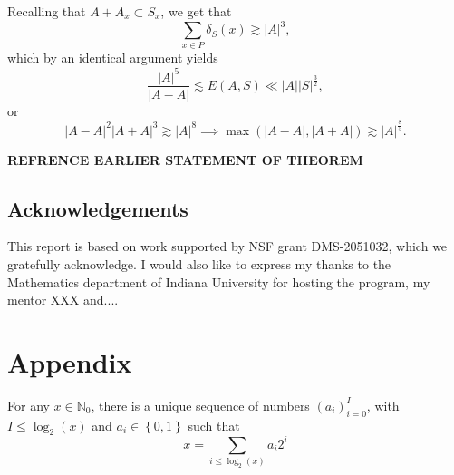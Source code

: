 \documentclass[12pt,reqno]{amsart}
\begin{document}
Recalling that \(A + A_{x} \subset S_{x} \), we get that
\[
    \sum _{x \in P} \delta_{S} (x) \gtrsim \left\lvert A \right\rvert ^{3} 
,\]
which by an identical argument yields
\[
    \frac{\left\lvert A \right\rvert ^{5} }{\left\lvert A-A \right\rvert } \lesssim E(A,S) \ll \left\lvert A \right\rvert \left\lvert S \right\rvert ^{\frac{3}{2} }
,\]
or
\[
    \left\lvert A-A \right\rvert ^{2} \left\lvert A+A \right\rvert ^{3} \gtrsim \left\lvert A \right\rvert ^{8} \implies \max \left( \left\lvert A-A \right\rvert , \left\lvert A+A \right\rvert  \right) \gtrsim \left\lvert A \right\rvert^{\frac{8}{5} }
.\]

\textbf{REFRENCE EARLIER STATEMENT OF THEOREM}

\subsection*{Acknowledgements} %
This report is based on work supported by NSF grant DMS-2051032, which we gratefully acknowledge. I would also like to express my thanks to the Mathematics department of Indiana University for hosting the program, my mentor XXX and....




\section*{Appendix}

\begin{theorem*}
For any \(x \in \mathbb{N}_{0}  \), there is a unique sequence of numbers \(\left( a_{i}  \right) _{i = 0} ^{I} \), with
\(I \leq \log _{2} \left( x \right) \) and \(a_{i} \in \left\{ 0,1 \right\} \) such that
\[
    x = \sum _{i \leq \log _{2} \left( x \right) } a_{i} 2^{i}
\]
\end{theorem*}
\end{document}
